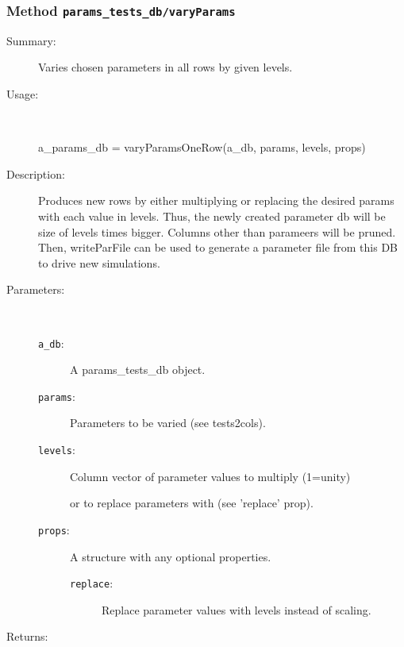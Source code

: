 \subsubsection[Method \texttt{varyParams}]{Method \texttt{params\_tests\_db/varyParams}}%
%
\label{ref_params_tests_db__varyParams}%
\hypertarget{ref_params_tests_db__varyParams}{}%
\begin{description}
\item[Summary:]Varies chosen parameters in all rows by given levels.
%
\item[Usage:]~%
\begin{lyxcode}%
a\_params\_db = varyParamsOneRow(a\_db, params, levels, props)
%
\end{lyxcode}%
%
\item[Description:]%
Produces new rows by either multiplying or replacing the desired params
 with each value in levels. Thus, the newly created parameter db will be
 size of levels times bigger. Columns other than parameers will be
 pruned. Then, writeParFile can be used to generate a parameter file
 from this DB to drive new simulations.
\item[Parameters:]~
\begin{description}%
\item[\texttt{a\_db}:]
 A params\_tests\_db object.
\item[\texttt{params}:]
 Parameters to be varied (see tests2cols).
\item[\texttt{levels}:]
 Column vector of parameter values to multiply (1=unity)

or to replace parameters with (see 'replace' prop).
\item[\texttt{props}:]
 A structure with any optional properties.
\begin{description}%
\item[\texttt{replace}:]
 Replace parameter values with levels instead of scaling.
\end{description}%
\end{description}%
%
\item[Returns:
]~


\end{description}
